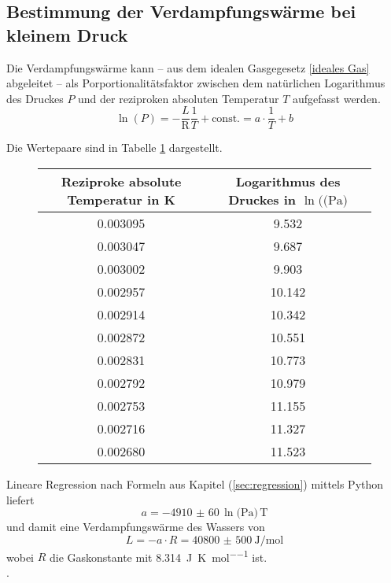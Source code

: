 \subsection{Bestimmung der Verdampfungswärme bei kleinem Druck}
\label{sec:bestimmungverdampfungswarme}
Die Verdampfungswärme kann -- aus dem idealen Gasgegesetz \eqref{ideales Gas} abgeleitet --  als Porportionalitätsfaktor zwischen dem natürlichen Logarithmus des Druckes $P$ und der reziproken absoluten Temperatur $T$ aufgefasst werden. 
\begin{equation}
\ln(P) = - \frac{L}{\text{R}} \frac{1}{T} + \text{const.} = a \cdot \frac{1}{T} +b
\end{equation}



Die Wertepaare sind in Tabelle \ref{tab:druck-temperatur} dargestellt.
\begin{figure}[h!]
	\centering
\begin{tabular}{c|c}
	Reziproke absolute Temperatur in \si{\kelvin}&   Logarithmus des Druckes in $\ln{(\text{(Pa)}}$ \\
	\hline
	0.003095 &                   9.532 \\
	0.003047 &                   9.687 \\
	0.003002 &                   9.903 \\
	0.002957&                  10.142  \\
	0.002914 &                  10.342 \\
	0.002872 &                  10.551  \\
	0.002831 &                  10.773 \\
	0.002792 &                  10.979  \\
	0.002753 &                  11.155  \\
	0.002716 &                  11.327 \\
	0.002680&                  11.523 \\
\end{tabular}
\label{tab:druck-temperatur}
\end{figure}


Lineare Regression nach Formeln aus Kapitel (\ref{sec:regression}) mittels Python liefert
\begin{equation}
a= \num{-4910(60)} \,\ln{\text{(Pa)}}\, \text{T}
\end{equation}
und damit eine Verdampfungswärme des Wassers von
\begin{equation}
L = - a \cdot R = \SI{40800(500)}{\joule\per\mol} 
\end{equation}
wobei $R$ die Gaskonstante mit \SI{8.314}{\joule\per\kelvin\per\mol} ist. \\
.


